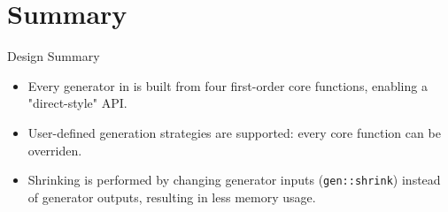 \section{Summary}

\begin{frame}{\halcheck{} \textemdash{} Design \textemdash{} Summary}
  \begin{itemize}
    \item Every generator in \halcheck{} is built from four first-order core functions, enabling a "direct-style" API.
    \item User-defined generation strategies are supported: every core function can be overriden.
    \item Shrinking is performed by changing generator inputs (\texttt{gen::shrink}) instead of generator outputs, resulting in less memory usage.
  \end{itemize}
\end{frame}
